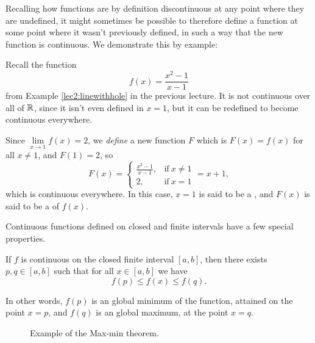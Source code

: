 
Recalling how functions are by definition discontinuous at any point where they are undefined, it might sometimes be possible to therefore define a function at some point where it wasn't previously defined, in such a way that the new function is continuous.
We demonstrate this by example:

\begin{example}
	Recall the function
	\[
		f(x) = \frac{x^2 - 1}{x - 1}
	\]
	from Example \ref{lec2:linewithhole} in the previous lecture.
	It is not continuous over all of $\mathbb{R}$, since it isn't even defined in $x = 1$, but it can be redefined to become continuous everywhere.

	Since $\lim\limits_{x \to 1} f(x) = 2$, we \emph{define} a new function $F$ which is $F(x) = f(x)$ for all $x \neq 1$, and $F(1) = 2$, so
	\[
		F(x) = \begin{cases}
		\frac{x^2 - 1}{x - 1}, & \text{if}~ x \neq 1 \\
		2, & \text{if}~ x = 1
		\end{cases}
		= x + 1,
	\]
	which is continuous everywhere.
	In this case, $x = 1$ is said to be a , and $F(x)$ is said to be a  of $f(x)$.
\end{example}


Continuous functions defined on closed and finite intervals have a few special properties.

\begin{theorem}
	If $f$ is continuous on the closed finite interval $[a, b]$, then there exists $p, q \in [a, b]$ such that for all $x \in [a, b]$ we have
	\[
		f(p) \leq f(x) \leq f(q).
	\]

	\noindent
	In other words, $f(p)$ is an global minimum of the function, attained on the point $x = p$, and $f(q)$ is an global maximum, at the point $x = q$.
\end{theorem}

\begin{figure}
	\centering
	\caption{Example of the Max-min theorem.}
\end{figure}

